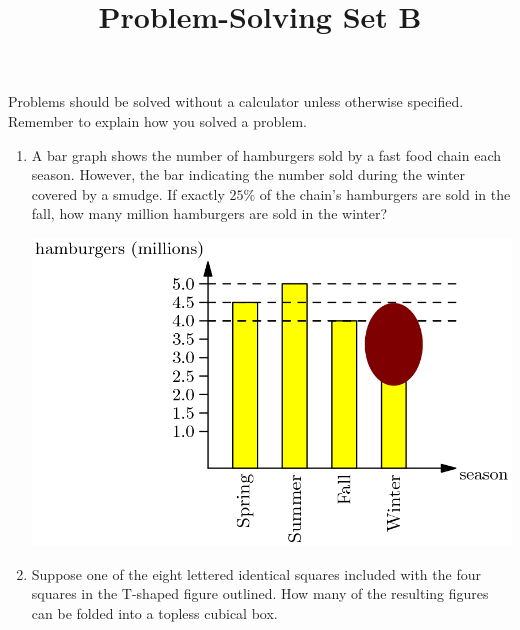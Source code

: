 \documentclass{article}
\title{Problem-Solving Set B}
\author{}
\date{}
\begin{document}
\maketitle
\noindent Problems should be solved without a calculator unless otherwise specified.
Remember to explain how you solved a problem.
\begin{multicols*}{2}
    \begin{enumerate}
        \item A bar graph shows the number of hamburgers sold by a fast food chain each season.
            However, the bar indicating the number sold during the winter covered by a smudge.
            If exactly $25\%$ of the chain's hamburgers are sold in the fall, how many million hamburgers are sold in the winter?
            \begin{center}
                \includegraphics[scale=0.2]{5-2_bar_graph.png}
            \end{center}
            \vspace{3cm}
        \item Suppose one of the eight lettered identical squares included with the four squares in the T-shaped figure outlined.
            How many of the resulting figures can be folded into a topless cubical box.
            \begin{center}
\end{center}
\end{enumerate}
\end{multicols*}
\end{document}
